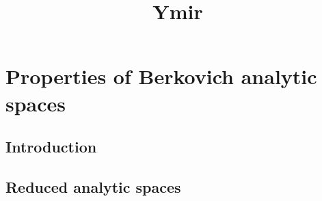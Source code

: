 
\title{Ymir}

\maketitle
\tableofcontents

\chapter*{Properties of Berkovich analytic spaces}\label{chap-BerkProperty}

\section{Introduction}\label{sec-introduction}

\section{Reduced analytic spaces}



\cite{stacks-project}

\printbibliography

